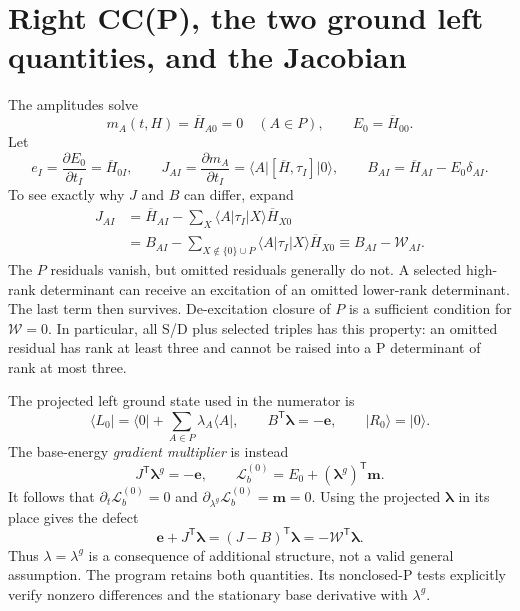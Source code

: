 \documentclass[11pt,letterpaper]{article}
\numberwithin{equation}{section}
\newcommand{\ket}[1]{\lvert #1\rangle}
\newcommand{\bra}[1]{\langle #1\rvert}
\newcommand{\me}[3]{\langle #1\rvert #2\lvert #3\rangle}
\newcommand{\bH}{\overline H}
\newcommand{\T}{\mathsf T}
\begin{document}
\section{Right CC(P), the two ground left quantities, and the Jacobian}
The amplitudes solve
\begin{equation}
 m_A(t,H)=\bH_{A0}=0\quad(A\in P),\qquad E_0=\bH_{00}.
 \label{eq:ccright}
\end{equation}
Let
\begin{equation}
 e_I=\frac{\partial E_0}{\partial t_I}=\bH_{0I},\qquad
 J_{AI}=\frac{\partial m_A}{\partial t_I}
       =\me{A}{[\bH,\tau_I]}{0},\qquad
 B_{AI}=\bH_{AI}-E_0\delta_{AI}.
 \label{eq:JBe}
\end{equation}
To see exactly why $J$ and $B$ can differ, expand
\begin{align}
 J_{AI}&=\bH_{AI}-\sum_X\me{A}{\tau_I}{X}\bH_{X0}\\
 &=B_{AI}-\sum_{X\notin\{0\}\cup P}
                \me{A}{\tau_I}{X}\bH_{X0}
       \equiv B_{AI}-\mathcal W_{AI}.
 \label{eq:JminusB}
\end{align}
The $P$ residuals vanish, but omitted residuals generally do not. A selected
high-rank determinant can receive an excitation of an omitted lower-rank
determinant. The last term then survives. De-excitation closure of $P$ is a
sufficient condition for $\mathcal W=0$. In particular, all S/D plus selected
triples has this property: an omitted residual has rank at least three and
cannot be raised into a P determinant of rank at most three.

The projected left ground state used in the numerator is
\begin{equation}
 \bra{L_0}=\bra{0}+\sum_{A\in P}\lambda_A\bra{A},\qquad
 B^{\T}\bm\lambda=-\bm e,\qquad \ket{R_0}=\ket{0}.
 \label{eq:projectedlambda}
\end{equation}
The base-energy \emph{gradient multiplier} is instead
\begin{equation}
 J^{\T}\bm\lambda^{g}=-\bm e,\qquad
 \mathcal L_b^{(0)}=E_0+(\bm\lambda^{g})^{\T}\bm m.
 \label{eq:lambdagrad}
\end{equation}
It follows that $\partial_t\mathcal L_b^{(0)}=0$ and
$\partial_{\lambda^g}\mathcal L_b^{(0)}=\bm m=0$.
Using the projected $\bm\lambda$ in its place gives the defect
\begin{equation}
 \bm e+J^{\T}\bm\lambda=(J-B)^{\T}\bm\lambda
                         =-\mathcal W^{\T}\bm\lambda.
 \label{eq:lambdadefect}
\end{equation}
Thus $\lambda=\lambda^g$ is a consequence of additional structure, not a
valid general assumption. The program retains both quantities. Its
nonclosed-P tests explicitly verify nonzero differences and the stationary
base derivative with $\lambda^g$.
\end{document}
